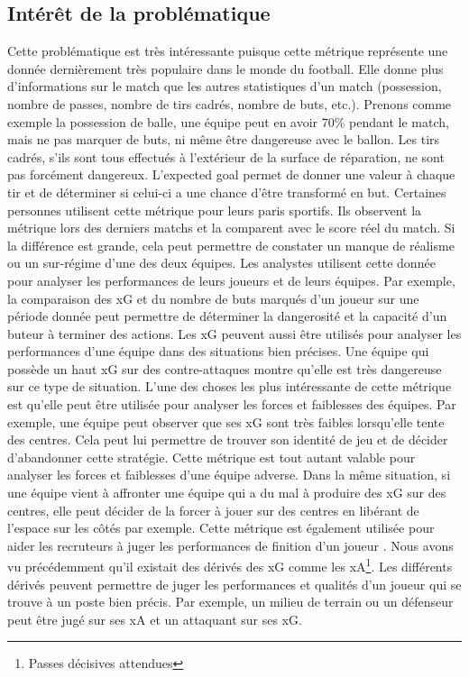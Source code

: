 \documentclass[12pt]{article}
\begin{document}
\subsection{Intérêt de la problématique}
Cette problématique est très intéressante puisque cette métrique représente une donnée dernièrement très populaire dans le monde du football. Elle donne plus d'informations sur le match que les autres statistiques d'un match (possession, nombre de passes, nombre de tirs cadrés, nombre de buts, etc.).
Prenons comme exemple la possession de balle, une équipe peut en avoir 70\% pendant le match, mais ne pas marquer de buts, ni même être dangereuse avec le ballon.
Les tirs cadrés, s'ils sont tous effectués à l'extérieur de la surface de réparation, ne sont pas forcément dangereux.
L'expected goal permet de donner une valeur à chaque tir et de déterminer si celui-ci a une chance d'être transformé en but.
\newline \newline
Certaines personnes utilisent cette métrique pour leurs paris sportifs.
Ils observent la métrique lors des derniers matchs et la comparent avec le score réel du match.
Si la différence est grande, cela peut permettre de constater un manque de réalisme ou un sur-régime d'une des deux équipes. \cite{tennerelBienUtiliserExpected2022a}
\newline \newline
Les analystes utilisent cette donnée pour analyser les performances de leurs joueurs et de leurs équipes. Par exemple, la comparaison des xG et du nombre de buts marqués d'un joueur sur une période donnée peut permettre de déterminer la dangerosité et la capacité d'un buteur à terminer des actions. \cite{pettyWhatExpectedGoals2018a}
Les xG peuvent aussi être utilisés pour analyser les performances d'une équipe dans des situations bien précises. Une équipe qui possède un haut xG sur des contre-attaques montre qu'elle est très dangereuse sur ce type de situation. \cite{XGExplainedFBrefa}
L'une des choses les plus intéressante de cette métrique est qu'elle peut être utilisée pour analyser les forces et faiblesses des équipes. Par exemple, une équipe peut observer que ses xG sont très faibles lorsqu'elle tente des centres. Cela peut lui permettre de trouver son identité de jeu et de décider d'abandonner cette stratégie. Cette métrique est tout autant valable pour analyser les forces et faiblesses d'une équipe adverse.
Dans la même situation, si une équipe vient à affronter une équipe qui a du mal à produire des xG sur des centres, elle peut décider de la forcer à jouer sur des centres en libérant de l'espace sur les côtés par exemple.
\newline \newline
Cette métrique est également utilisée pour aider les recruteurs à juger les performances de finition d'un joueur \cite{garratt-stanleyWhatExpectedGoals2022}. Nous avons vu précédemment qu'il existait des dérivés des xG comme les xA\footnote{Passes décisives attendues}.
Les différents dérivés peuvent permettre de juger les performances et qualités d'un joueur qui se trouve à un poste bien précis.
Par exemple, un milieu de terrain ou un défenseur peut être jugé sur ses xA et un attaquant sur ses xG.
\end{document}
